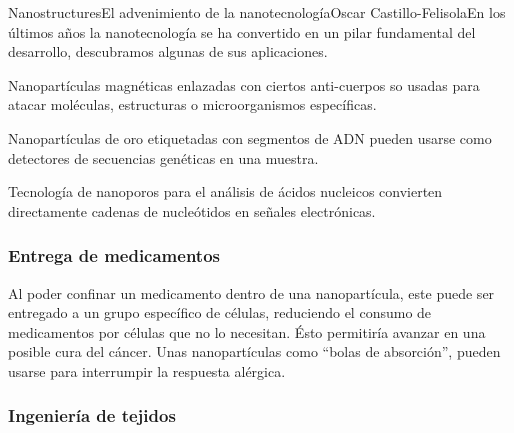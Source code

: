 \begin{article}{Nanostructures}{El advenimiento de la nanotecnolog\'ia}{Oscar Castillo-Felisola}{En los \'ultimos a\~nos la nanotecnolog\'ia se ha convertido en un pilar fundamental del desarrollo, descubramos algunas de sus aplicaciones.}

Nanopart\'iculas magn\'eticas enlazadas con ciertos anti-cuerpos so usadas para atacar mol\'eculas, estructuras o microorganismos  espec\'ificas.

Nanopart\'iculas de oro etiquetadas con segmentos de ADN pueden usarse como detectores de secuencias gen\'eticas en una muestra.

Tecnolog\'ia de nanoporos para el an\'alisis de \'acidos nucleicos convierten directamente cadenas de nucle\'otidos en se\~nales electr\'onicas.






\subsubsection*{Entrega de medicamentos}


Al poder confinar un medicamento dentro de una nanopart\'icula, este puede ser entregado a un grupo espec\'ifico de c\'elulas, reduciendo el consumo de medicamentos por c\'elulas que no lo necesitan. \'Esto permitir\'ia avanzar en una posible %
cura del c\'ancer.
Unas nanopart\'iculas como ``bolas de absorci\'on'', pueden usarse para interrumpir la respuesta al\'ergica. 

\subsubsection*{Ingenier\'ia de tejidos}


\end{article}
